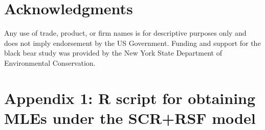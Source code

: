 \documentclass[12pt]{article}
\begin{document}
\section*{Acknowledgments}

Any use of trade, product, or firm names is for descriptive purposes only and does not imply endorsement by the US Government.
Funding and support for the black bear study was provided by the New York State Department of Environmental Conservation.




%


\section*{Appendix 1: {\bf R} script for obtaining MLEs under the SCR+RSF model}
\end{document}
